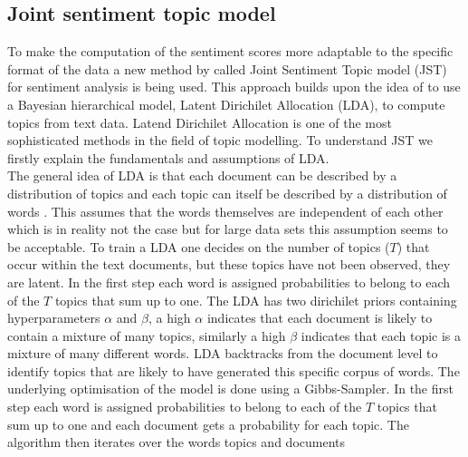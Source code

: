 \subsection{Joint sentiment topic model}\label{JST}
To make the computation of the sentiment scores more adaptable to the specific format of the data a new method by \citet{lin2009joint} called Joint Sentiment Topic model (JST) for sentiment analysis is being used. This approach builds upon the idea of \citet{blei2003latent} to use a Bayesian hierarchical model, Latent Dirichilet Allocation (LDA), to compute topics from text data. Latend Dirichilet Allocation is one of the most sophisticated methods in the field of topic modelling. To understand JST we firstly explain the fundamentals and assumptions of LDA. \\ 

The general idea of LDA is that each document can be described by a distribution of topics and each topic can itself be described by a distribution of words \citep{blei2003latent}. This assumes that the words themselves are independent of each other which is in reality not the case but for large data sets this assumption seems to be acceptable. To train a LDA one decides on the number of topics ($T$) that occur within the text documents, but these topics have not been observed, they are latent. In the first step each word is assigned probabilities to belong to each of the $T$ topics that sum up to one. 
The LDA has two dirichilet priors containing hyperparameters $\alpha$ and $\beta$, a high $\alpha$ indicates that each document is likely to contain a mixture of many topics, similarly a high $\beta$ indicates that each topic is a mixture of many different words. LDA backtracks from the document level to identify topics that are likely to have generated this specific corpus of words. The underlying optimisation of the model is done using a Gibbs-Sampler. In the first step each word is assigned probabilities to belong to each of the $T$ topics that sum up to one and each document gets a probability for each topic. The algorithm then iterates over the words topics and documents

